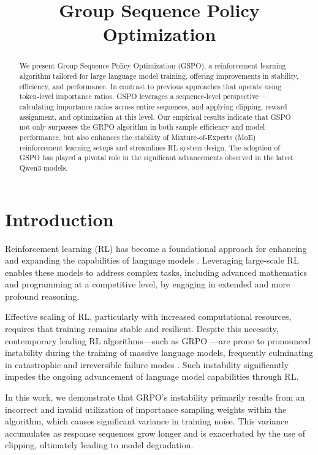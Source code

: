 \title{Group Sequence Policy Optimization}

\begin{abstract}
We present Group Sequence Policy Optimization (GSPO), a reinforcement learning algorithm tailored for large language model training, offering improvements in stability, efficiency, and performance. In contrast to previous approaches that operate using token-level importance ratios, GSPO leverages a sequence-level perspective—calculating importance ratios across entire sequences, and applying clipping, reward assignment, and optimization at this level. Our empirical results indicate that GSPO not only surpasses the GRPO algorithm in both sample efficiency and model performance, but also enhances the stability of Mixture-of-Experts (MoE) reinforcement learning setups and streamlines RL system design. The adoption of GSPO has played a pivotal role in the significant advancements observed in the latest Qwen3 models.
\end{abstract}

\section{Introduction}
\label{sec:intro}

Reinforcement learning (RL) has become a foundational approach for enhancing and expanding the capabilities of language models \citep{o1,dpsk-r1,qwq32b,qwen3}. Leveraging large-scale RL enables these models to address complex tasks, including advanced mathematics and programming at a competitive level, by engaging in extended and more profound reasoning.

Effective scaling of RL, particularly with increased computational resources, requires that training remains stable and resilient. Despite this necessity, contemporary leading RL algorithms—such as GRPO \citep{grpo}—are prone to pronounced instability during the training of massive language models, frequently culminating in catastrophic and irreversible failure modes \citep{qwen3, minimax-m1}. Such instability significantly impedes the ongoing advancement of language model capabilities through RL.

In this work, we demonstrate that GRPO’s instability primarily results from an incorrect and invalid utilization of importance sampling weights within the algorithm, which causes significant variance in training noise. This variance accumulates as response sequences grow longer and is exacerbated by the use of clipping, ultimately leading to model degradation.

